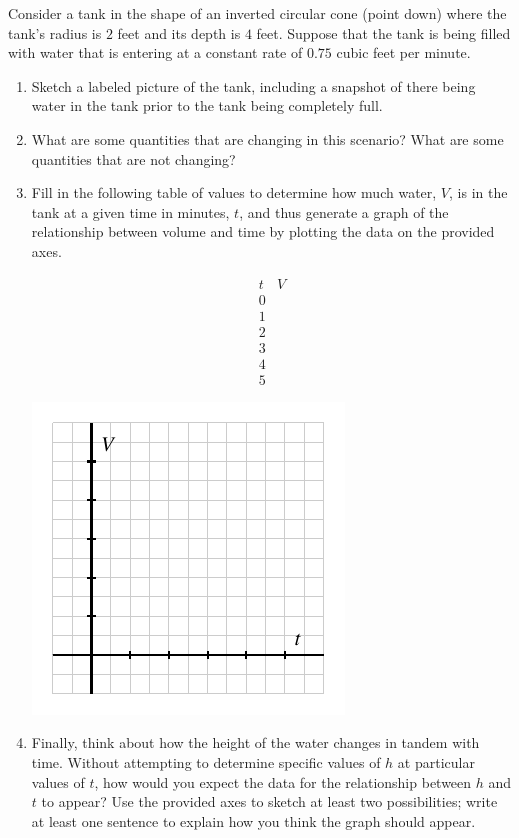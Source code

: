 \documentclass{ximera}
\begin{document}
\begin{exploration}
Consider a tank in the shape of an inverted circular cone (point down) where the tank's radius is $2$ feet and its depth is $4$ feet.  Suppose that the tank is being filled with water that is entering at a constant rate of $0.75$ cubic feet per minute.%
\begin{enumerate}[label=\alph*.]
\item Sketch a labeled picture of the tank, including a snapshot of there being water in the tank prior to the tank being completely full.%
\item What are some quantities that are changing in this scenario?  What are some quantities that are not changing?%
\item Fill in the following table of values to determine how much water, $V$, is in the tank at a given time in minutes, $t$, and thus generate a graph of the relationship between volume and time by plotting the data on the provided axes.%

$$
\begin{array}{cc}
t&V\\
\hline
0&\\
1&\\
2&\\
3&\\
4&\\
5&
\end{array}
$$


\begin{image}
\includegraphics{tandem-V-t-blank-axes.pdf}
\end{image}

\item Finally, think about how the height of the water changes in tandem with time.  Without attempting to determine specific values of $h$ at particular values of $t$, how would you expect the data for the relationship between $h$ and $t$ to appear?  Use the provided axes to sketch at least two possibilities; write at least one sentence to explain how you think the graph should appear.%



\end{enumerate}
\end{exploration}
\end{document}
